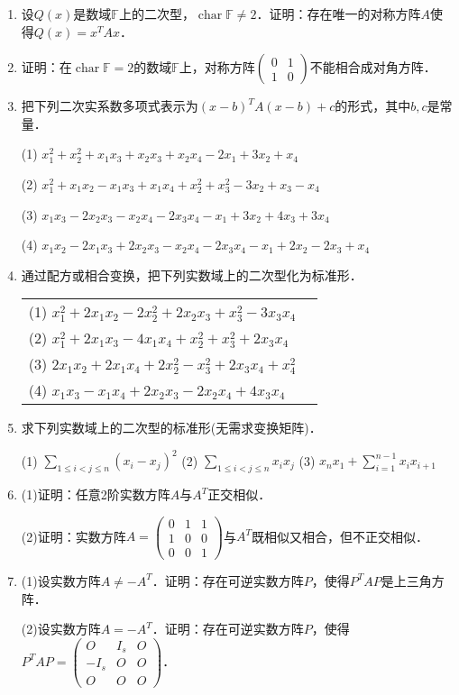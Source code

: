 \documentclass[a4paper,fontset=windows]{ctexbook}
\theoremstyle{definition}
\DeclareMathOperator{\Char}{char}
\renewcommand{\le}{\leqslant}
\begin{document}
\begin{enumerate}
\item 设$Q(x)$是数域$\mathbb{F}$上的二次型，$\Char\mathbb{F}\ne 2$．证明：存在唯一的对称方阵$A$使得$Q(x)=x^TAx$．

\item 证明：在$\Char\mathbb{F}=2$的数域$\mathbb{F}$上，对称方阵$\begin{pmatrix}0&1 \\ 1&0\end{pmatrix}$不能相合成对角方阵．

\item 把下列二次实系数多项式表示为$(x-b)^TA(x-b)+c$的形式，其中$b,c$是常量．

(1) $x_1^2+x_2^2+x_1x_3+x_2x_3+x_2x_4-2x_1+3x_2+x_4$

(2) $x_1^2+x_1x_2-x_1x_3+x_1x_4+x_2^2+x_3^2-3x_2+x_3-x_4$

(3) $x_1x_3-2x_2x_3-x_2x_4-2x_3x_4-x_1+3x_2+4x_3+3x_4$

(4) $x_1x_2-2x_1x_3+2x_2x_3-x_2x_4-2x_3x_4-x_1+2x_2-2x_3+x_4$

\item 通过配方或相合变换，把下列实数域上的二次型化为标准形．

\hspace*{-6pt}\begin{tabular}{ll}
(1) $x_1^2+2x_1x_2-2x_2^2+2x_2x_3+x_3^2-3x_3x_4$ \\
(2) $x_1^2+2x_1x_3-4x_1x_4+x_2^2+x_3^2 +2x_3x_4$ \\
(3) $2x_1x_2+2x_1x_4+2x_2^2-x_3^2+2x_3x_4+x_4^2$ \\
(4) $x_1x_3-x_1x_4+2x_2x_3-2x_2x_4+4x_3x_4$ \\
\end{tabular}

\item 求下列实数域上的二次型的标准形(无需求变换矩阵)．

(1) $\sum\limits_{1\le i<j\le n}(x_i-x_j)^2$ \hspace{0.5in}
(2) $\sum\limits_{1\le i<j\le n}x_ix_j$ \hspace{0.5in}
(3) $x_nx_1+\sum\limits_{i=1}^{n-1}x_ix_{i+1}$

\item (1)证明：任意2阶实数方阵$A$与$A^T$正交相似．

(2)证明：实数方阵$A=\begin{pmatrix}0&1&1 \\ 1&0&0 \\ 0&0&1\end{pmatrix}$与$A^T$既相似又相合，但不正交相似．

\item (1)设实数方阵$A\ne -A^T$．证明：存在可逆实数方阵$P$，使得$P^TAP$是上三角方阵．

(2)设实数方阵$A=-A^T$．证明：存在可逆实数方阵$P$，使得$P^TAP=\begin{pmatrix}O&I_s&O \\ -I_s&O&O \\ O&O&O\end{pmatrix}$．

\end{enumerate}
\end{document}
